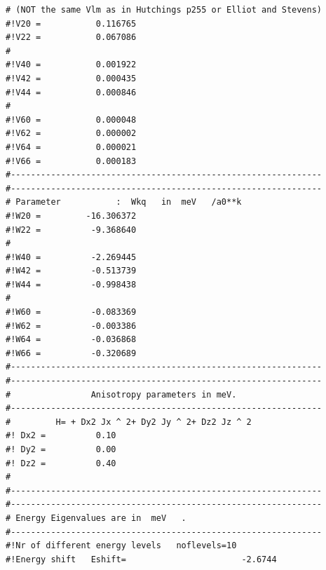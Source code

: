 \begin{enumerate}
{\begin{verbatim}
# (NOT the same Vlm as in Hutchings p255 or Elliot and Stevens)
#!V20 =           0.116765                                     
#!V22 =           0.067086                                     
#                                                              
#!V40 =           0.001922                                     
#!V42 =           0.000435                                     
#!V44 =           0.000846                                     
#                                                              
#!V60 =           0.000048                                     
#!V62 =           0.000002                                     
#!V64 =           0.000021                                     
#!V66 =           0.000183                                     
#-------------------------------------------------------------- 
#-------------------------------------------------------------- 
# Parameter           :  Wkq   in  meV   /a0**k                  
#!W20 =         -16.306372                                     
#!W22 =          -9.368640                                     
#                                                              
#!W40 =          -2.269445                                     
#!W42 =          -0.513739                                     
#!W44 =          -0.998438                                     
#                                                              
#!W60 =          -0.083369                                     
#!W62 =          -0.003386                                     
#!W64 =          -0.036868                                     
#!W66 =          -0.320689                                     
#-------------------------------------------------------------- 
#-------------------------------------------------------------- 
#                Anisotropy parameters in meV.                  
#-------------------------------------------------------------- 
#         H= + Dx2 Jx ^ 2+ Dy2 Jy ^ 2+ Dz2 Jz ^ 2               
#! Dx2 =          0.10                                     
#! Dy2 =          0.00                                     
#! Dz2 =          0.40                                     
#                                                              
#-------------------------------------------------------------- 
#-------------------------------------------------------------- 
# Energy Eigenvalues are in  meV   .          	            
#--------------------------------------------------------------
#!Nr of different energy levels   noflevels=10                 
#!Energy shift   Eshift=                       -2.6744 

\end{verbatim}}
\end{enumerate}
